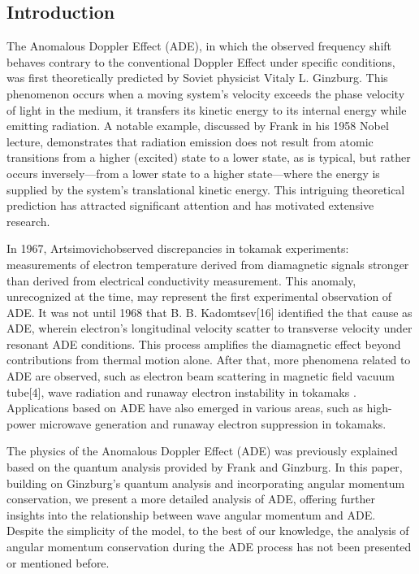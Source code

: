 \documentclass{cpbtex}
\begin{document}
\begin{CJK*}{GBK}{song}
\section{Introduction}
The Anomalous Doppler Effect (ADE)\cite{tamm1959general,frank1960optics,ginzburg1960certain,shustin1971transformation}, in which the observed frequency shift behaves contrary to the conventional Doppler Effect under specific conditions, was first theoretically predicted by Soviet physicist Vitaly L. Ginzburg\cite{ginzburg1946radiation}. This phenomenon occurs when a moving system’s velocity exceeds the phase velocity of light in the medium, it transfers its kinetic energy to its internal energy while emitting radiation. A notable example, discussed by Frank in his 1958 Nobel lecture\cite{frank1960optics}, demonstrates that radiation emission does not result from atomic transitions from a higher (excited) state to a lower state, as is typical, but rather occurs inversely—from a lower state to a higher state—where the energy is supplied by the system’s translational kinetic energy. This intriguing theoretical prediction has attracted significant attention and has motivated extensive research\cite{nezlin1976negative,santini1984anomalous,kho1988slow,wang2016multi,guo2018control,liu2018role,shi2018superlight,filatov2021role}.

In 1967, Artsimovich\cite{artsimovich1967thermal}observed discrepancies in tokamak experiments: measurements of electron temperature derived from diamagnetic signals stronger than derived from electrical conductivity measurement. This anomaly, unrecognized at the time, may represent the first experimental observation of ADE. It was not until 1968 that B. B. Kadomtsev\cite{kadomtsev1968electric}[16]  identified the that cause as ADE, wherein electron’s longitudinal velocity scatter to transverse velocity under resonant ADE conditions. This process amplifies the diamagnetic effect beyond contributions from thermal motion alone. After that, more phenomena related to ADE are observed, such as electron beam scattering in magnetic field vacuum tube[4], wave radiation\cite{spong2018first,liu2019intense,gorozhanin1997waves} and runaway electron instability in tokamaks \cite{sajjad2007runaway,castejon2003particle}. Applications based on ADE have also emerged in various areas, such as high-power microwave generation and runaway electron suppression in tokamaks\cite{guo2018control,zhang2024self}.

The physics of the Anomalous Doppler Effect (ADE) was previously explained based on the quantum analysis provided by Frank and Ginzburg\cite{frank1960optics,ginzburg1979nonlinear}. In this paper, building on Ginzburg’s quantum analysis and incorporating angular momentum conservation, we present a more detailed analysis of ADE, offering further insights into the relationship between  wave angular momentum and ADE. Despite the simplicity of the model, to the best of our knowledge, the analysis of angular momentum conservation during the ADE process has not been presented or mentioned before. 


\end{CJK*}
\end{document}
